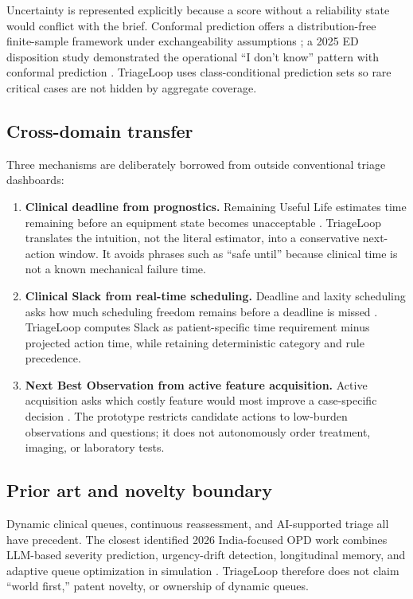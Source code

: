 \documentclass[11pt,a4paper]{article}
\begin{document}
Uncertainty is represented explicitly because a score without a reliability state would conflict with the brief. Conformal prediction offers a distribution-free finite-sample framework under exchangeability assumptions \cite{angelopoulos2023}; a 2025 ED disposition study demonstrated the operational ``I don't know'' pattern with conformal prediction \cite{abdulai2025}. TriageLoop uses class-conditional prediction sets so rare critical cases are not hidden by aggregate coverage.

\subsection{Cross-domain transfer}

Three mechanisms are deliberately borrowed from outside conventional triage dashboards:

\begin{enumerate}
  \item \textbf{Clinical deadline from prognostics.} Remaining Useful Life estimates time remaining before an equipment state becomes unacceptable \cite{nasaRUL}. TriageLoop translates the intuition, not the literal estimator, into a conservative next-action window. It avoids phrases such as ``safe until'' because clinical time is not a known mechanical failure time.
  \item \textbf{Clinical Slack from real-time scheduling.} Deadline and laxity scheduling asks how much scheduling freedom remains before a deadline is missed \cite{liu1973}. TriageLoop computes Slack as patient-specific time requirement minus projected action time, while retaining deterministic category and rule precedence.
  \item \textbf{Next Best Observation from active feature acquisition.} Active acquisition asks which costly feature would most improve a case-specific decision \cite{ibmafa}. The prototype restricts candidate actions to low-burden observations and questions; it does not autonomously order treatment, imaging, or laboratory tests.
\end{enumerate}

\subsection{Prior art and novelty boundary}

Dynamic clinical queues, continuous reassessment, and AI-supported triage all have precedent. The closest identified 2026 India-focused OPD work combines LLM-based severity prediction, urgency-drift detection, longitudinal memory, and adaptive queue optimization in simulation \cite{gupta2026}. TriageLoop therefore does not claim ``world first,'' patent novelty, or ownership of dynamic queues.
\end{document}
